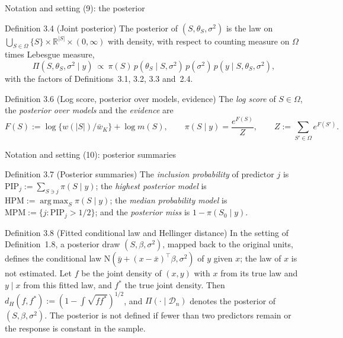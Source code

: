 \documentclass[aspectratio=169]{beamer}
\newcommand{\R}{\mathbb{R}}
\newcommand{\abs}[1]{\lvert #1\rvert}
\DeclareMathOperator*{\argmax}{arg\,max}
\newcommand{\Normal}{\mathrm{N}}
\newcommand{\Sz}{S_0}
\newcommand{\Dn}{\mathcal D_n}
\newcommand{\Om}{\Omega}
\newcommand{\pis}[1]{\pi(#1\mid y)}
\newcommand{\PIP}{\mathrm{PIP}}
\newcommand{\HPM}{\mathrm{HPM}}
\newcommand{\MPM}{\mathrm{MPM}}
\begin{document}
\begin{frame}{Notation and setting (9): the posterior}
\footnotesize
\begin{block}{Definition 3.4 (Joint posterior)}
The posterior of $(S,\theta_S,\sigma^2)$ is the law on $\bigcup_{S\in\Om}\{S\}\times\R^{\abs{S}}\times(0,\infty)$ with
density, with respect to counting measure on $\Om$ times Lebesgue measure,
\[
  \Pi(S,\theta_S,\sigma^2\mid y)\ \propto\ \pi(S)\,p(\theta_S\mid S,\sigma^2)\,p(\sigma^2)\,p(y\mid S,\theta_S,\sigma^2),
\]
with the factors of Definitions~3.1, 3.2, 3.3 and~2.4.
\end{block}
\begin{block}{Definition 3.6 (Log score, posterior over models, evidence)}
The \emph{log score} of $S\in\Om$, the \emph{posterior over models} and the \emph{evidence} are
\begin{equation}\tag{8}
  F(S):=\log\{w(\abs{S})/\bar w_K\}+\log m(S),\qquad \pis{S}=\frac{e^{F(S)}}{Z},\qquad Z:=\sum_{S'\in\Om}e^{F(S')} .
\end{equation}
\end{block}
\end{frame}

\begin{frame}{Notation and setting (10): posterior summaries}
\footnotesize
\begin{block}{Definition 3.7 (Posterior summaries)}
The \emph{inclusion probability} of predictor $j$ is $\PIP_j:=\sum_{S\ni j}\pis{S}$; the \emph{highest posterior model} is
$\HPM:=\argmax_S\pis{S}$; the \emph{median probability model} is $\MPM:=\{j:\PIP_j>1/2\}$; and the \emph{posterior miss}
is $1-\pis{\Sz}$.
\end{block}
\begin{block}{Definition 3.8 (Fitted conditional law and Hellinger distance)}
In the setting of Definition~1.8, a posterior draw $(S,\beta,\sigma^2)$, mapped back to the original
units, defines the conditional law $\Normal(\bar y+(x-\bar x)^\top\beta,\sigma^2)$ of $y$ given $x$; the law of $x$ is not
estimated. Let $f$ be the joint density of $(x,y)$ with $x$ from its true law and $y\mid x$ from this fitted law, and $f^*$
the true joint density. Then $d_H(f,f^*):=(1-\int\sqrt{ff^*})^{1/2}$, and $\Pi(\cdot\mid\Dn)$ denotes the posterior of
$(S,\beta,\sigma^2)$. The posterior is not defined if fewer than two predictors remain or the response is constant in the
sample.
\end{block}
\end{frame}
\end{document}
